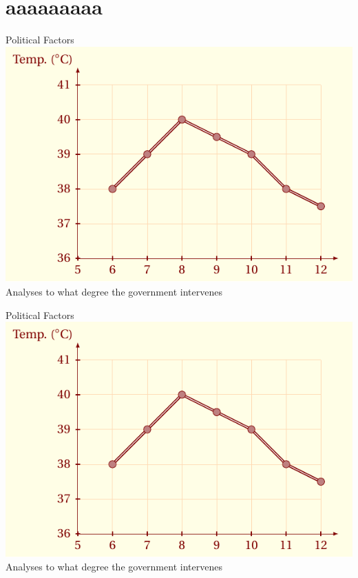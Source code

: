 \documentclass{article}
\begin{document}
\lipsum[1]
\section{aaaaaaaaa}

\begin{mybox}{Political Factors}
    \includegraphics[scale=.3]{pdf/cal_fun1.pdf}
    \tcblower
    Analyses to what degree the government intervenes
\end{mybox}
\lipsum[2]
\newpage
\begin{mybox}{Political Factors}
    \includegraphics[scale=.3]{pdf/cal_fun1.pdf}
    \tcblower
    Analyses to what degree the government intervenes
\end{mybox}
\end{document}
